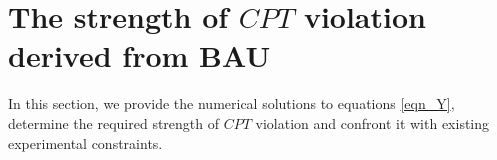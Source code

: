 \documentclass[12pt]{revtex4}
\newcommand{\Tsph}{T_{\rm sph}}
\begin{document}


%
%
\section{The strength of $CPT$ violation derived from BAU}


In this section, we provide the numerical solutions to equations \eqref{eqn_Y},
determine the required strength of $CPT$ violation and confront it with 
existing experimental constraints.
\end{document}
